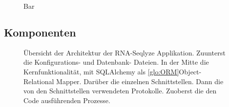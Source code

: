 \documentclass[a4paper]{thesis}
\begin{document}
\begin{figure}[h]\centering
{}
\caption[Use Cases]{
	Bar
}
\label{fig:usecases}
\end{figure}

\subsection{Komponenten}

\begin{figure}[h]\centering
{}
\caption[Applikationsarchitektur]{
	Übersicht der Architektur der RNA-Seqlyze Applikation.
	Zuunterst die Konfigurations- und Datenbank- Dateien.
	In der Mitte die Kernfunktionalität, mit SQLAlchemy
	als \ref{glo:ORM}{Object-Relational Mapper}.
        Darüber die einzelnen Schnittstellen.
	Dann die von den Schnittstellen verwendeten Protokolle.
	Zuoberst die den Code ausführenden Prozesse.
}
\label{fig:arch}
\end{figure}
\end{document}
